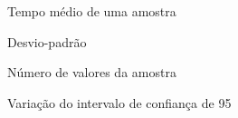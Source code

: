 \item [$\bar{X}$] Tempo médio de uma amostra
\item [$\sigma$] Desvio-padrão
\item [\textit{n}] Número de valores da amostra
\item [$\Delta$] Variação do intervalo de confiança de 95%
